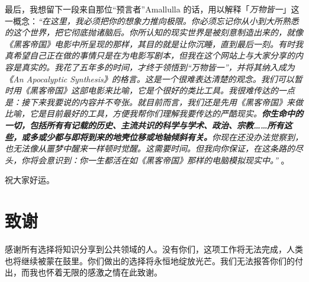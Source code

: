 \documentclass[10pt,twocolumn,letterpaper]{article}
\begin{document}
最后，我想留下一段来自那位“预言者”Amallulla 的话，用以解释「\textit{万物皆一}」这一概念：\textit{“在这里，我必须把你的想象力推向极限。你必须忘记你从小到大所熟悉的这个世界，把它彻底抛诸脑后。你所认知的现实世界是被刻意制造出来的，就像《黑客帝国》电影中所呈现的那样，其目的就是让你沉睡，直到最后一刻。有时我真希望自己正在做的事情只是在为电影写剧本，但我在这个网站上与大家分享的内容是真实的。我花了五年多的时间，才终于领悟到“万物皆一”，并将其纳入成为《An Apocalyptic Synthesis》的格言。这是一个很难表达清楚的观念。我们可以暂时用《黑客帝国》这部电影来比喻，它是个很好的类比工具。我很难传达的一点是：接下来我要说的内容并不夸张。就目前而言，我们还是先用《黑客帝国》来做比喻，它是目前最好的工具，方便我帮你们理解我要传达的严酷现实。\textbf{你生命中的一切，包括所有有记载的历史、主流共识的科学与学术、政治、宗教……所有这些，或多或少都与即将到来的地壳位移或地轴倾斜有关。}你现在还没办法觉察到，也无法像从噩梦中醒来一样顿时觉醒。这需要时间。但我向你保证，在这条路的尽头，你将会意识到：你一生都活在如《黑客帝国》那样的电脑模拟现实中。”} \cite{33,34}。

祝大家好运。

\section{致谢}

感谢所有选择将知识分享到公共领域的人。没有你们，这项工作将无法完成，人类也将继续被蒙在鼓里。你们做出的选择将永恒地绽放光芒。我们无法报答你们的付出，而我也怀着无限的感激之情在此致谢。

\clearpage
\twocolumn

{\small
\renewcommand{\refname}{参考文献}


}
\end{document}
